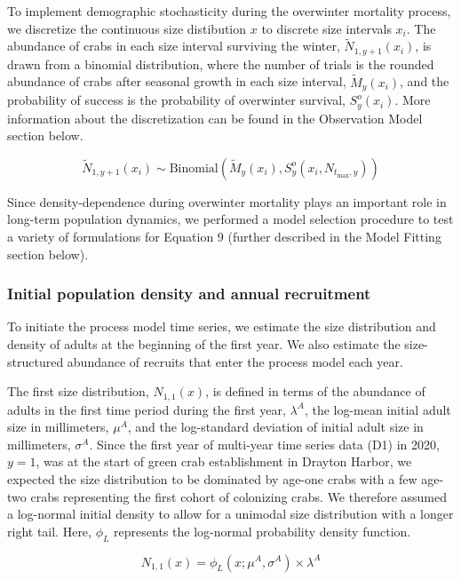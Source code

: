 \documentclass{article}
\begin{document}
To implement demographic stochasticity during the overwinter mortality process, we discretize the continuous size distibution $x$ to discrete size intervals $x_i$. The abundance of crabs in each size interval surviving the winter, $\tilde{N}_{1,y+1}(x_i)$, is drawn from a binomial distribution, where the number of trials is the rounded abundance of crabs after seasonal growth in each size interval, $\tilde{M}_y(x_i)$, and the probability of success is the probability of overwinter survival, $S^o_y(x_i)$. More information about the discretization can be found in the Observation Model section below.

\begin{equation}
\tilde{N}_{1,y+1}(x_i) \sim \text{Binomial}\left(\tilde{M}_y(x_i),  S_y^o(x_i, N_{t_{\text{max}},y})\right)
\end{equation}

Since density-dependence during overwinter mortality plays an important role in long-term population dynamics, we performed a model selection procedure to test a variety of formulations for Equation 9 (further described in the Model Fitting section below).

\subsubsection*{Initial population density and annual recruitment}

To initiate the process model time series, we estimate the size distribution and density of adults at the beginning of the first year. We also estimate the size-structured abundance of recruits that enter the process model each year. 

The first size distribution, $N_{1, 1}(x)$, is defined in terms of the abundance of adults in the first time period during the first year, $\lambda^{A}$, the log-mean initial adult size in millimeters, $\mu^A$, and the log-standard deviation of initial adult size in millimeters, $\sigma^A$. Since the first year of multi-year time series data (D1) in 2020, $y = 1$, was at the start of green crab establishment in Drayton Harbor, we expected the size distribution to be dominated by age-one crabs with a few age-two crabs representing the first cohort of colonizing crabs. We therefore assumed a log-normal initial density to allow for a unimodal size distribution with a longer right tail. Here, $\phi_L$ represents the log-normal probability density function.

\begin{equation}
N_{1, 1}(x) = \phi_L(x; \mu^A, \sigma^A) \times \lambda^A
\end{equation}
\end{document}
